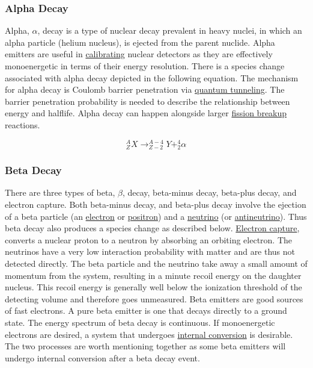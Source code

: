 \documentclass[12pt]{article}
\begin{document}
\begin{doublespacing}
\subsubsection{Alpha Decay}
Alpha, $\alpha$, decay is a type of nuclear decay prevalent in heavy nuclei, in which an alpha particle (helium nucleus), is ejected from the parent nuclide. Alpha emitters are useful in \href{http://cs.smu.ca/~andrew/files/ugthesis/SMU-Thesis-v.1.0.1.pdf}{calibrating} nuclear detectors as they are effectively monoenergetic in terms of their energy resolution. There is a species change associated with alpha decay depicted in the following equation.
The mechanism for alpha decay is Coulomb barrier penetration via \href{https://en.wikipedia.org/wiki/Quantum_tunneling}{quantum tunneling}. The barrier penetration probability is needed to describe the relationship between energy and halflife. Alpha decay can happen alongside larger \href{https://en.wikipedia.org/wiki/Nuclear_fission}{fission breakup} reactions.

\begin{equation} \label{alphaDecayEqn}
^A_Z X \rightarrow ^{A-4}_{Z-2}Y + ^4_2 \alpha
\end{equation}


\subsubsection{Beta Decay}
There are three types of beta, $\beta$, decay, beta-minus decay, beta-plus decay, and electron capture. Both beta-minus decay, and beta-plus decay involve the ejection of a beta particle (an \href{http://en.wikipedia.org/wiki/Electron}{electron} or \href{http://en.wikipedia.org/wiki/Positron}{positron}) and a \href{http://en.wikipedia.org/wiki/Neutrino}{neutrino} (or \href{http://en.wikipedia.org/wiki/Antineutrino#Antineutrinos}{antineutrino}). Thus beta decay also produces a species change as described below. \href{https://en.wikipedia.org/wiki/Electron_capture}{Electron capture}, converts a nuclear proton to a neutron by absorbing an orbiting electron.
The neutrinos have a very low interaction probability with matter and are thus not detected directly. The beta particle and the neutrino take away a small amount of momentum from the system, resulting in a minute recoil energy on the daughter nucleus. This recoil energy is generally well below the ionization threshold of the detecting volume and therefore goes unmeasured.
Beta emitters are good sources of fast electrons. A pure beta emitter is one that decays directly to a ground state. The energy spectrum of beta decay is continuous. If monoenergetic electrons are desired, a system that undergoes \href{https://en.wikipedia.org/wiki/Internal_conversion}{internal conversion} is desirable. The two processes are worth mentioning together as some beta emitters will undergo internal conversion after a beta decay event.


\end{doublespacing}
\end{document}
